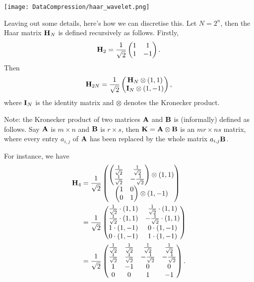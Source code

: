 \begin{center}
\texttt{[image: DataCompression/haar\_wavelet.png]}
\end{center}


Leaving out some details, here's how we can discretise this. Let $N = 2^n$, then the Haar matrix ${\bf H}_N$ is defined recursively as follows. Firstly,
\[
    {\bf H}_2 = \frac{1}{\sqrt{2}} \begin{pmatrix}
    1 & 1\\
    1 & -1
    \end{pmatrix}.
\]
Then
\[
    {\bf H}_{2N} = \frac{1}{\sqrt{2}} \begin{pmatrix}
    {\bf H}_N  \otimes (1,1)\\
    {\bf I}_N \otimes (1,-1)
    \end{pmatrix},
\]
where ${\bf I}_N$ is the identity matrix and $\otimes$ denotes the Kronecker product.

Note: the Kronecker product of two matrices ${\bf A}$ and ${\bf B}$ is (informally) defined as follows. Say ${\bf A}$ is $m \times n$ and ${\bf B}$ is $r \times s$, then ${\bf K} = {\bf A} \otimes {\bf B}$ is an $mr \times ns$ matrix, where every entry $a_{i,j}$ of ${\bf A}$ has been replaced by the whole matrix $a_{i,j}{\bf B}$.

For instance, we have
\begin{align*}
    {\bf H}_4 &= \frac{1}{\sqrt{2}} \begin{pmatrix}
     \begin{pmatrix}
    \frac{1}{\sqrt{2}} & \frac{1}{\sqrt{2}}\\
    \frac{1}{\sqrt{2}} & -\frac{1}{\sqrt{2}}
    \end{pmatrix} \otimes (1,1)\\
    \begin{pmatrix}
    1 & 0\\
    0 & 1
    \end{pmatrix} \otimes (1, -1)
    \end{pmatrix}\\
    &= \frac{1}{\sqrt{2}} \begin{pmatrix}
    \frac{1}{\sqrt{2}} \cdot (1,1) & \frac{1}{\sqrt{2}} \cdot (1,1)\\
    \frac{1}{\sqrt{2}} \cdot (1,1) & -\frac{1}{\sqrt{2}} \cdot (1,1)\\
    1 \cdot (1, -1) & 0 \cdot (1, -1)\\
    0 \cdot (1, -1) & 1 \cdot (1, -1)
    \end{pmatrix}\\
    &= \frac{1}{ \sqrt{2} } \begin{pmatrix}
    \frac{1}{\sqrt{2}}           & \frac{1}{\sqrt{2}}         & \frac{1}{\sqrt{2}}         & \frac{1}{\sqrt{2}}\\
    \frac{1}{\sqrt{2}}           & \frac{1}{\sqrt{2}}         & -\frac{1}{\sqrt{2}}        & -\frac{1}{\sqrt{2}}\\
    1    & -1 & 0         & 0\\
    0           & 0         & 1  & -1
    \end{pmatrix}.
\end{align*}


